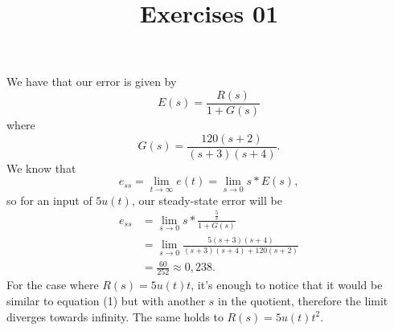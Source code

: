 \documentclass[a4paper]{report}
\title{Exercises 01}
\begin{document}
\maketitle



We have that our error is given by \[
    E(s) = \frac{R(s)}{1 + G(s)}
\] where \[
G(s) = \frac{120(s+2)}{(s+3)(s+4)}
.\]
We know that \[
    e_{ss} = \lim_{t \to \infty} e(t) = \lim_{s \to 0} s*E(s)
,\] so for an input of $5u(t)$, our steady-state error will be
\begin{equation}
\begin{split}
    e_{ss} &= \lim_{s \to 0} s*\frac{\frac{5}{s}}{1 + G(s)}  \\
	   &= \lim_{s \to 0} \frac{5(s+3)(s+4)}{(s+3)(s+4) + 120(s+2)} \\
	   &= \frac{60}{252} \approx 0,238.
\end{split}
\end{equation}
For the case where $R(s)=5u(t)t$, it's enough to notice that it would be similar to equation (1) but
with another $s$ in the quotient, therefore the limit diverges towards infinity. The same holds to
$R(s)=5u(t)t^2$.
\end{document}
